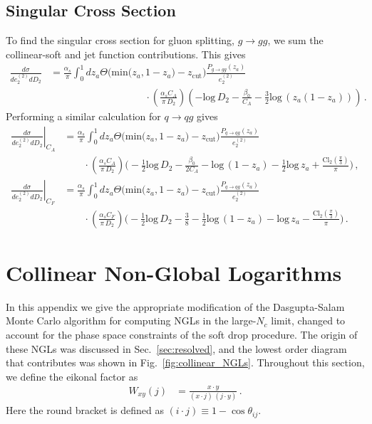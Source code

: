 \documentclass[a4paper,11pt]{article}
\newcommand{\ecf}[2]{e_{#1}^{(#2)}}
\def\log{\text{log}}
\newcommand{\nn}{\nonumber}
\def\zcut{z_{\text{cut}}}
\DeclareRobustCommand{\Sec}[1]{Sec.~\ref{#1}}
\DeclareRobustCommand{\Fig}[1]{Fig.~\ref{#1}}
\begin{document}
\subsection{Singular Cross Section}
To find the singular cross section for gluon splitting, $g\to gg$, we sum the collinear-soft and jet function contributions. This gives
{\small\begin{align}
\frac{d\sigma}{d\ecf{2}{2} dD_2}&=\frac{\alpha_s}{\pi}\int_{0}^{1}dz_a\Theta\Big(\text{min}\big(z_a,1-z_a\big)-\zcut\Big)\frac{P_{g\rightarrow gg}(z_a)}{\ecf{2}{2}}  \\
&\hspace{4cm}\cdot\left(\frac{\alpha_sC_A}{\pi\,D_2}\right)\left(-\log\,D_2-\frac{\beta_0}{C_A}-\frac{3}{2}\log\,(z_a(1-z_a))\right)\,.\nn
\end{align}}
Performing a similar calculation for $q\to qg$ gives
{\small\begin{align}
\left.\frac{d\sigma}{d\ecf{2}{2} dD_2}\right |_{C_A}&=\frac{\alpha_s}{\pi}\int_{0}^{1}dz_a\Theta\Big(\text{min}\big(z_a,1-z_a\big)-\zcut\Big) \frac{P_{q\rightarrow qg}(z_a)}{\ecf{2}{2}}   \\
&\qquad \cdot \left(\frac{\alpha_sC_A}{\pi\,D_2}\right)\Bigg(-\frac{1}{2}\log\,D_2-\frac{\beta_0}{2C_A}-\log\,(1-z_a)-\frac{1}{2}\log\,z_a+\frac{\text{Cl}_2(\frac{\pi}{3})}{\pi}\Bigg)\,,\nn\\
\left. \frac{d\sigma}{d\ecf{2}{2} dD_2}\right|_{C_F}&=\frac{\alpha_s}{\pi}\int_{0}^{1}dz_a\Theta\Big(\text{min}\big(z_a,1-z_a\big)-\zcut\Big) \frac{P_{q\rightarrow qg}(z_a)}{\ecf{2}{2}}\\
&\qquad \cdot \left(\frac{\alpha_sC_F}{\pi\,D_2}\right)\Bigg(-\frac{1}{2}\log\,D_2-\frac{3}{8}-\frac{1}{2}\log\,(1-z_a)-\log\,z_a-\frac{\text{Cl}_2(\frac{\pi}{3})}{\pi}\Bigg)\,. \nn
\end{align}}

\section{Collinear Non-Global Logarithms}\label{sec:NGL_alg}

In this appendix we give the appropriate modification of the Dasgupta-Salam Monte Carlo algorithm \cite{Dasgupta:2001sh} for computing NGLs in the large-$N_c$ limit, changed to account for the phase space constraints of the soft drop procedure. The origin of these NGLs was discussed in \Sec{sec:resolved}, and the lowest order diagram that contributes was shown in \Fig{fig:collinear_NGLs}. Throughout this section, we define the eikonal factor as
\begin{align}
W_{x y}(j)&=\frac{x\cdot y}{(x\cdot j)\,(j\cdot y)}\,.
\end{align}
Here the round bracket is defined as $(i\cdot j)\equiv 1-\cos \theta_{ij}$.
\end{document}
